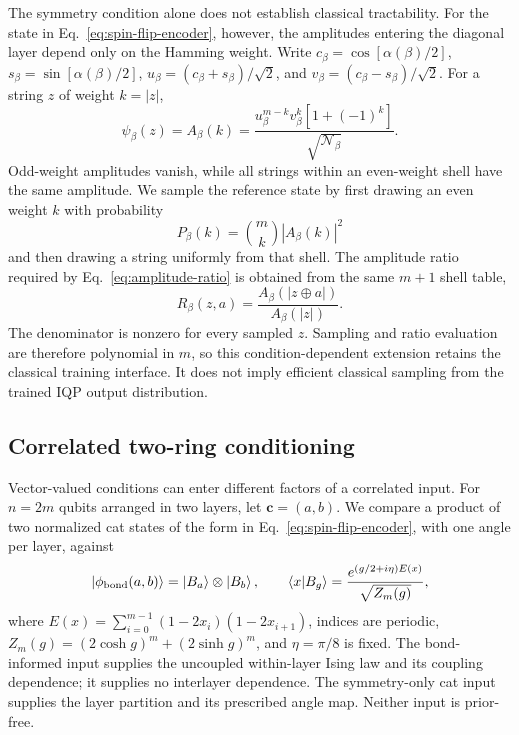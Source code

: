 \documentclass[pra,aps,10pt,twocolumn,floatfix,superscriptaddress,
notitlepage,longbibliography]{revtex4-2}
\begin{document}
The symmetry condition alone does not establish classical tractability. For the state in Eq.~\eqref{eq:spin-flip-encoder}, however, the amplitudes entering the diagonal layer depend only on the Hamming weight. Write $c_\beta=\cos[\alpha(\beta)/2]$, $s_\beta=\sin[\alpha(\beta)/2]$, $u_\beta=(c_\beta+s_\beta)/\sqrt{2}$, and $v_\beta=(c_\beta-s_\beta)/\sqrt{2}$. For a string $z$ of weight $k=|z|$,
\begin{equation}
    \psi_\beta(z)=A_\beta(k)
    =\frac{u_\beta^{m-k}v_\beta^k\left[1+(-1)^k\right]}{\sqrt{\mathcal N_\beta}}.
    \label{eq:spin-flip-shell-amplitude}
\end{equation}
Odd-weight amplitudes vanish, while all strings within an even-weight shell have the same amplitude. We sample the reference state by first drawing an even weight $k$ with probability
\begin{equation}
    P_\beta(k)=\binom{m}{k}|A_\beta(k)|^2
    \label{eq:spin-flip-shell-probability}
\end{equation}
and then drawing a string uniformly from that shell. The amplitude ratio required by Eq.~\eqref{eq:amplitude-ratio} is obtained from the same $m+1$ shell table,
\begin{equation}
    R_\beta(z,a)=\frac{A_\beta(|z\oplus a|)}{A_\beta(|z|)}.
    \label{eq:spin-flip-shell-ratio}
\end{equation}
The denominator is nonzero for every sampled $z$. Sampling and ratio evaluation are therefore polynomial in $m$, so this condition-dependent extension retains the classical training interface. It does not imply efficient classical sampling from the trained IQP output distribution.

\subsection{Correlated two-ring conditioning}
\label{sec:two-ring-encoding}

Vector-valued conditions can enter different factors of a correlated input. For $n=2m$ qubits arranged in two layers, let $\boldsymbol c=(a,b)$. We compare a product of two normalized cat states of the form in Eq.~\eqref{eq:spin-flip-encoder}, with one angle per layer, against
\begin{equation}
 \ket{\phi_{\rm bond}(a,b)}=\ket{B_a}\otimes\ket{B_b},\qquad
 \langle x|B_g\rangle=\frac{e^{(g/2+i\eta)E(x)}}{\sqrt{Z_m(g)}},
 \label{eq:bond-input}
\end{equation}
where $E(x)=\sum_{i=0}^{m-1}(1-2x_i)(1-2x_{i+1})$, indices are periodic, $Z_m(g)=(2\cosh g)^m+(2\sinh g)^m$, and $\eta=\pi/8$ is fixed. The bond-informed input supplies the uncoupled within-layer Ising law and its coupling dependence; it supplies no interlayer dependence. The symmetry-only cat input supplies the layer partition and its prescribed angle map. Neither input is prior-free.
\end{document}
